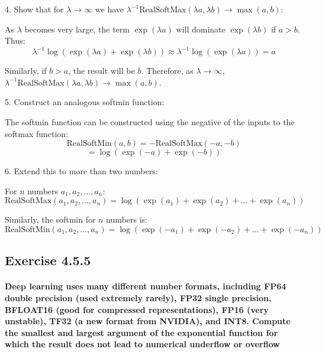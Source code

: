 4. Show that for \( \lambda \to \infty \) we have \( \lambda^{-1} \text{RealSoftMax}(\lambda a, \lambda b) \to \max(a, b) \):

As \( \lambda \) becomes very large, the term \( \exp(\lambda a) \) will dominate \( \exp(\lambda b) \) if \( a > b \). Thus:
\[ \lambda^{-1} \log(\exp(\lambda a) + \exp(\lambda b)) \approx \lambda^{-1} \log(\exp(\lambda a)) = a \]

Similarly, if \( b > a \), the result will be \( b \). Therefore, as \( \lambda \to \infty \), \( \lambda^{-1} \text{RealSoftMax}(\lambda a, \lambda b) \to \max(a, b) \).

5. Construct an analogous softmin function:

The softmin function can be constructed using the negative of the inputs to the softmax function:
\[ \text{RealSoftMin}(a, b) = -\text{RealSoftMax}(-a, -b) \]
\[ = \log(\exp(-a) + \exp(-b)) \]

6. Extend this to more than two numbers:

For \( n \) numbers \( a_1, a_2, \ldots, a_n \):
\[ \text{RealSoftMax}(a_1, a_2, \ldots, a_n) = \log(\exp(a_1) + \exp(a_2) + \ldots + \exp(a_n)) \]

Similarly, the softmin for \( n \) numbers is:
\[ \text{RealSoftMin}(a_1, a_2, \ldots, a_n) = \log(\exp(-a_1) + \exp(-a_2) + \ldots + \exp(-a_n)) \]

\subsection{Exercise 4.5.5}

\paragraph{Deep learning uses many different number formats, including FP64 double precision (used extremely rarely), FP32 single precision, BFLOAT16 (good for compressed representations), FP16 (very unstable), TF32 (a new format from NVIDIA), and INT8. Compute the smallest and largest argument of the exponential function for which the result does not lead to numerical underflow or overflow}

